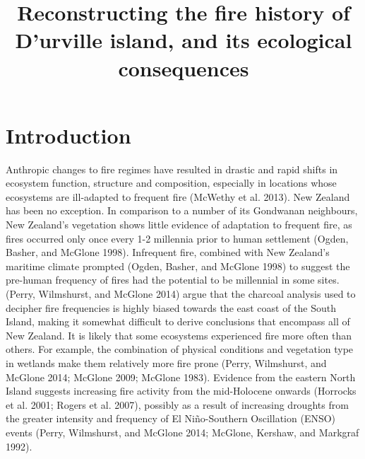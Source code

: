 \documentclass[]{article}
\title{Reconstructing the fire history of D'urville island, and its ecological consequences}
\date{}
\begin{document}
\maketitle

\section{Introduction}\label{introduction}

Anthropic changes to fire regimes have resulted in drastic and rapid shifts in ecosystem function, structure and composition, especially in locations whose ecosystems are ill-adapted to frequent fire (McWethy et al. 2013). New Zealand has been no exception. In comparison to a number of its Gondwanan neighbours, New Zealand's vegetation shows little evidence of adaptation to frequent fire, as fires occurred only once every 1-2 millennia prior to human settlement (Ogden, Basher, and McGlone 1998). Infrequent fire, combined with New Zealand's maritime climate prompted (Ogden, Basher, and McGlone 1998) to suggest the pre-human frequency of fires had the potential to be millennial in some sites. (Perry, Wilmshurst, and McGlone 2014) argue that the charcoal analysis used to decipher fire frequencies is highly biased towards the east coast of the South Island, making it somewhat difficult to derive conclusions that encompass all of New Zealand. It is likely that some ecosystems experienced fire more often than others. For example, the combination of physical conditions and vegetation type in wetlands make them relatively more fire prone (Perry, Wilmshurst, and McGlone 2014; McGlone 2009; McGlone 1983). Evidence from the eastern North Island suggests increasing fire activity from the mid-Holocene onwards (Horrocks et al. 2001; Rogers et al. 2007), possibly as a result of increasing droughts from the greater intensity and frequency of El Niño-Southern Oscillation (ENSO) events (Perry, Wilmshurst, and McGlone 2014; McGlone, Kershaw, and Markgraf 1992).
\end{document}
